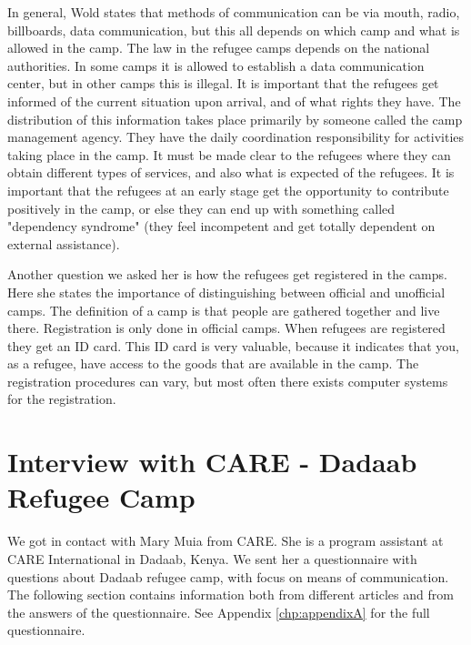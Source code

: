 In general, Wold states that methods of communication can be via mouth, radio, billboards, data communication, but this all depends on which camp and what is allowed in the camp. The law in the refugee camps depends on the national authorities. In some camps it is allowed to establish a data communication center, but in other camps this is illegal. It is important that the refugees get informed of the current situation upon arrival, and of what rights they have. The distribution of this information takes place primarily by someone called the camp management agency. They have the daily coordination responsibility for activities taking place in the camp. It must be made clear to the refugees where they can obtain different types of services, and also what is expected of the refugees. It is important that the refugees at an early stage get the opportunity to contribute positively in the camp, or else they can end up with something called "dependency syndrome" (they feel incompetent and get totally dependent on external assistance). 

Another question we asked her is how the refugees get registered in the camps. Here she states the importance of distinguishing between official and unofficial camps. The definition of a camp is that people are gathered together and live there. Registration is only done in official camps. When refugees are registered they get an ID card. This ID card is very valuable, because it indicates that you, as a refugee, have access to the goods that are available in the camp. The registration procedures can vary, but most often there exists computer systems for the registration.



\section{Interview with CARE - Dadaab Refugee Camp}
\label{sec:interviewcare}
We got in contact with Mary Muia from CARE. She is a program assistant at CARE International in Dadaab, Kenya. We sent her a questionnaire with questions about Dadaab refugee camp, with focus on means of communication. The following section contains information both from different articles and from the answers of the questionnaire. See Appendix \ref{chp:appendixA} for the full questionnaire. 

